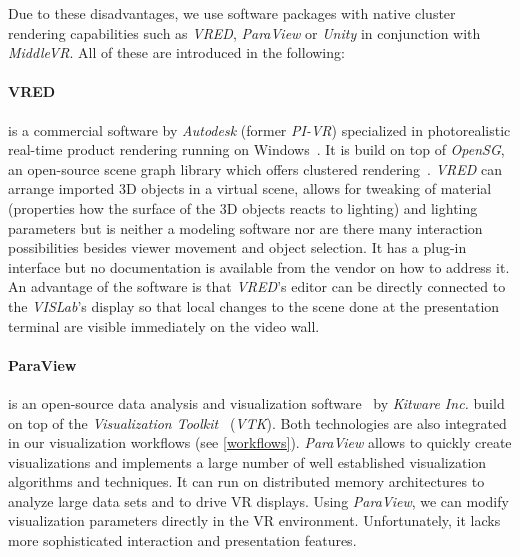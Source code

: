 \documentclass[twocolumn]{svjour3}          %
\begin{document}
Due to these disadvantages, we use software packages with native cluster rendering capabilities such as \emph{VRED}, \emph{ParaView} or \emph{Unity} in conjunction with \emph{MiddleVR}. All of these are introduced in the following:

\paragraph{VRED}
is a commercial software by \emph{Autodesk} (former \emph{PI-VR}) specialized in photorealistic real-time product rendering running on Windows~\cite{web:vred}. It is build on top of \emph{OpenSG}, an open-source scene graph library which offers clustered rendering~\cite{opensg}. \emph{VRED} can arrange imported 3D objects in a virtual scene, allows for tweaking of material (properties how the surface of the 3D objects reacts to lighting) and lighting parameters but is neither a modeling software nor are there many interaction possibilities besides viewer movement and object selection. It has a plug-in interface but no documentation is available from the vendor on how to address it. An advantage of the software is that \emph{VRED}'s editor can be directly connected to the \emph{VISLab}'s display so that local changes to the scene done at the presentation terminal are visible immediately on the video wall.

\paragraph{ParaView}
is an open-source data analysis and visualization software~\cite{paraview} by \emph{Kitware Inc.} build on top of the \emph{Visualization Toolkit}~\cite{vtk} (\emph{VTK}). Both technologies are also integrated in our visualization workflows (see \ref{workflows}). \emph{ParaView} allows to quickly create visualizations and implements a large number of well established visualization algorithms and techniques. It can run on distributed memory architectures to analyze large data sets and to drive VR displays. Using \emph{ParaView}, we can modify visualization parameters directly in the VR environment. Unfortunately, it lacks more sophisticated interaction and presentation features.
\end{document}
